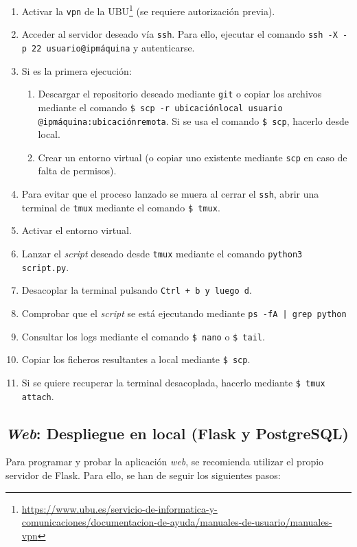 \begin{enumerate}
	\item Activar la \texttt{vpn} de la UBU\footnote{\url{https://www.ubu.es/servicio-de-informatica-y-comunicaciones/documentacion-de-ayuda/manuales-de-usuario/manuales-vpn}} (se requiere autorización previa).
	\item Acceder al servidor deseado vía \texttt{ssh}. Para ello, ejecutar el comando \texttt{ssh -X -p 22 usuario@ipmáquina} y autenticarse.
	\item Si es la primera ejecución:
		\begin{enumerate}
			\item Descargar el repositorio deseado mediante \texttt{git} o copiar los archivos mediante el comando \texttt{\$ scp -r ubicaciónlocal usuario} \texttt{@ipmáquina:ubicaciónremota}. Si se usa el comando \texttt{\$ scp}, hacerlo desde local.
			\item Crear un entorno virtual (o copiar uno existente mediante \texttt{scp} en caso de falta de permisos).
		\end{enumerate}
	\item Para evitar que el proceso lanzado se muera al cerrar el \texttt{ssh}, abrir una terminal de \texttt{tmux} mediante el comando \texttt{\$ tmux}.
	\item Activar el entorno virtual.
	\item Lanzar el \textit{script} deseado desde \texttt{tmux} mediante el comando \texttt{python3 script.py}.
	\item Desacoplar la terminal pulsando \texttt{Ctrl + b y luego d}.
	\item Comprobar que el \textit{script} se está ejecutando mediante \texttt{ps -fA | grep python}
	\item Consultar los logs mediante el comando \texttt{\$ nano} o \texttt{\$ tail}.
	\item Copiar los ficheros resultantes a local mediante \texttt{\$ scp}.
	\item Si se quiere recuperar la terminal desacoplada, hacerlo mediante \texttt{\$ tmux attach}.
\end{enumerate}

\subsection{\textit{Web}: Despliegue en local (Flask y PostgreSQL)}

Para programar y probar la aplicación \textit{web}, se recomienda utilizar el propio servidor de Flask. Para ello, se han de seguir los siguientes pasos:

